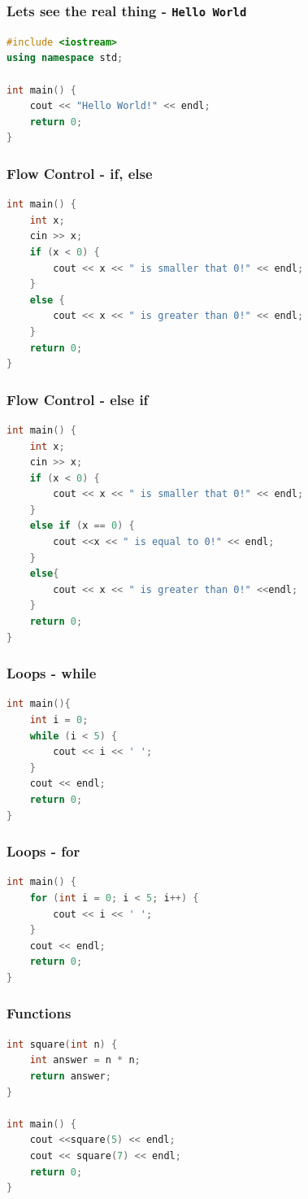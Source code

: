 \documentclass{beamer}
\begin{document}
\begin{frame}[fragile]
	\frametitle{Lets see the real thing - \texttt{Hello World}}

	\begin{lstlisting}[language=C++]
#include <iostream>
using namespace std;

int main() {
	cout << "Hello World!" << endl;
	return 0;
}
	\end{lstlisting}
\end{frame}

\begin{frame}[fragile]
	\frametitle{Flow Control - if, else}

	\begin{lstlisting}[language=C++]
int main() {
	int x;
	cin >> x;
	if (x < 0) {
		cout << x << " is smaller that 0!" << endl;
	}
	else {
		cout << x << " is greater than 0!" << endl;
	}
	return 0;
}
	\end{lstlisting}
\end{frame}

\begin{frame}[fragile]
	\frametitle{Flow Control - else if}

	\begin{lstlisting}[language=C++]
int main() {
	int x;
	cin >> x;
	if (x < 0) {
		cout << x << " is smaller that 0!" << endl;
	}
	else if (x == 0) {
		cout <<x << " is equal to 0!" << endl;
	}
	else{
		cout << x << " is greater than 0!" <<endl;
	}
	return 0;
}
	\end{lstlisting}
\end{frame}

\begin{frame}[fragile]
	\frametitle{Loops - while}

	\begin{lstlisting}[language=C++]
int main(){
	int i = 0;
	while (i < 5) {
		cout << i << ' ';
	}
	cout << endl;
	return 0;
}
	\end{lstlisting}
\end{frame}

\begin{frame}[fragile]
	\frametitle{Loops - for}

	\begin{lstlisting}[language=C++]
int main() {
	for (int i = 0; i < 5; i++) {
		cout << i << ' ';
	}
	cout << endl;
	return 0;
}
	\end{lstlisting}
\end{frame}

\begin{frame}[fragile]
	\frametitle{Functions}

	\begin{lstlisting}[language=C++]
int square(int n) {
	int answer = n * n;
	return answer;
}

int main() {
	cout <<square(5) << endl;
	cout << square(7) << endl;
	return 0;
}
	\end{lstlisting}
\end{frame}
\end{document}
